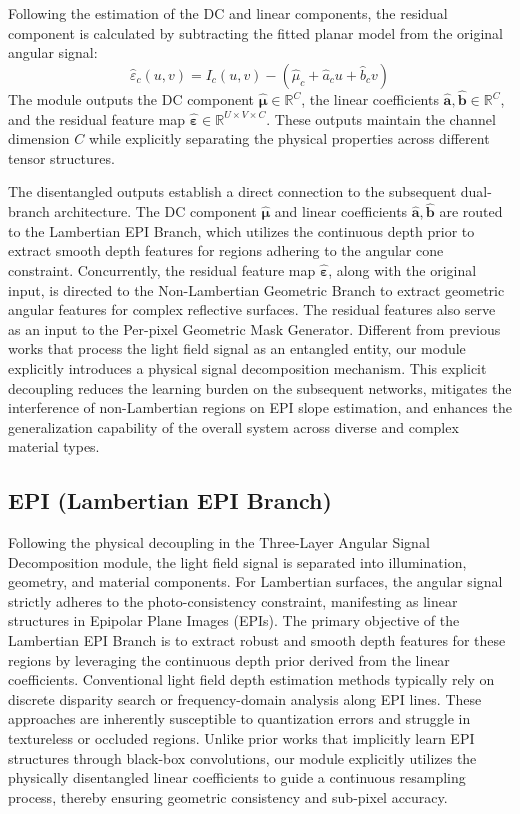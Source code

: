 Following the estimation of the DC and linear components, the residual component is calculated by subtracting the fitted planar model from the original angular signal:
\begin{equation}
\label{eq:eq8}
\hat{\varepsilon}_c(u,v) = I_c(u,v) - (\hat{\mu}_c + \hat{a}_c u + \hat{b}_c v)
\end{equation}
The module outputs the DC component $\hat{\boldsymbol{\mu}} \in \mathbb{R}^{C}$, the linear coefficients $\hat{\mathbf{a}}, \hat{\mathbf{b}} \in \mathbb{R}^{C}$, and the residual feature map $\hat{\boldsymbol{\varepsilon}} \in \mathbb{R}^{U \times V \times C}$. These outputs maintain the channel dimension $C$ while explicitly separating the physical properties across different tensor structures.

The disentangled outputs establish a direct connection to the subsequent dual-branch architecture. The DC component $\hat{\boldsymbol{\mu}}$ and linear coefficients $\hat{\mathbf{a}}, \hat{\mathbf{b}}$ are routed to the Lambertian EPI Branch, which utilizes the continuous depth prior to extract smooth depth features for regions adhering to the angular cone constraint. Concurrently, the residual feature map $\hat{\boldsymbol{\varepsilon}}$, along with the original input, is directed to the Non-Lambertian Geometric Branch to extract geometric angular features for complex reflective surfaces. The residual features also serve as an input to the Per-pixel Geometric Mask Generator. Different from previous works that process the light field signal as an entangled entity, our module explicitly introduces a physical signal decomposition mechanism. This explicit decoupling reduces the learning burden on the subsequent networks, mitigates the interference of non-Lambertian regions on EPI slope estimation, and enhances the generalization capability of the overall system across diverse and complex material types.

\subsection{EPI (Lambertian EPI Branch)}

Following the physical decoupling in the Three-Layer Angular Signal Decomposition module, the light field signal is separated into illumination, geometry, and material components. For Lambertian surfaces, the angular signal strictly adheres to the photo-consistency constraint, manifesting as linear structures in Epipolar Plane Images (EPIs). The primary objective of the Lambertian EPI Branch is to extract robust and smooth depth features for these regions by leveraging the continuous depth prior derived from the linear coefficients. Conventional light field depth estimation methods typically rely on discrete disparity search or frequency-domain analysis along EPI lines. These approaches are inherently susceptible to quantization errors and struggle in textureless or occluded regions. Unlike prior works that implicitly learn EPI structures through black-box convolutions, our module explicitly utilizes the physically disentangled linear coefficients to guide a continuous resampling process, thereby ensuring geometric consistency and sub-pixel accuracy.

